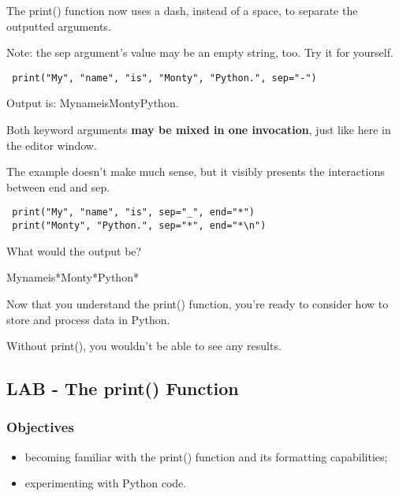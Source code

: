 \documentclass[a4paper,10pt]{article}
\begin{document}
The {\selectfont print()} function now uses a dash, instead of a space, to separate the outputted arguments.
\newline

Note: the {\selectfont sep} argument's value may be an empty string, too. Try it for yourself.

\begin{verbatim}
 print("My", "name", "is", "Monty", "Python.", sep="-")
\end{verbatim}


Output is:
{\selectfont MynameisMontyPython.}
\newline




Both keyword arguments \textbf{may be mixed in one invocation}, just like here in the editor window.
\newline

The example doesn't make much sense, but it visibly presents the interactions between {\selectfont end} and {\selectfont sep}.

\begin{verbatim}
 print("My", "name", "is", sep="_", end="*")
 print("Monty", "Python.", sep="*", end="*\n")
\end{verbatim}


What would the output be?
\newline

{\selectfont My\underline{\hspace{.10in}}name\underline{\hspace{.10in}}is*Monty*Python*}
\newline

Now that you understand the {\selectfont print()} function, you're ready to consider how to store and process data in Python.
\newline

Without {\selectfont print()}, you wouldn't be able to see any results.

\subsection{LAB - The print() Function}
\subsubsection{Objectives}
\begin{itemize}
 \item becoming familiar with the {\selectfont print()} function and its formatting capabilities;
 \item experimenting with Python code.
\end{itemize}
\end{document}
